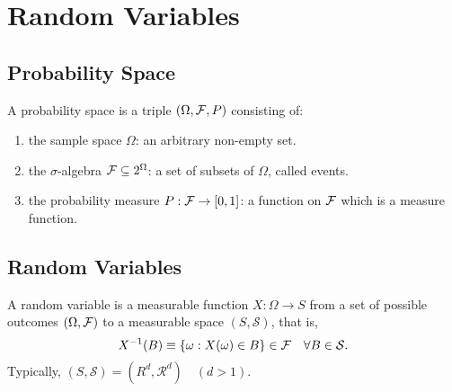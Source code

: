 \chapter{Random Variables}


\section{Probability Space}

\begin{definition}
	A probability space is a triple \((\Omega,\mathcal{F},P)\) consisting of:
	\begin{enumerate}
		\item the sample space \(\Omega\): an arbitrary non-empty set.
		\item the \(\sigma\)-algebra \(\mathcal{F}\subseteq 2^{\Omega}\): a set of subsets of \(\Omega\), called events.
		\item the probability measure \(P:\mathcal{F} \rightarrow[0,1]\): a function on \(\mathcal{F}\) which is a measure function.
	\end{enumerate}
\end{definition}

\section{Random Variables}

\begin{definition}
	A random variable is a measurable function \(X:\Omega\rightarrow S\) from a set of possible outcomes \((\Omega,\mathcal{F})\) to a measurable space \((S,\mathcal{S})\), that is,
	\begin{equation}
		X^{-1}(B)\equiv\{\omega:X(\omega)\in B\}\in\mathcal{F}\quad \forall B\in\mathcal{S}.
	\end{equation}
	Typically, \((S,\mathcal{S})=(R^d,\mathcal{R}^d)\quad(d>1)\).
\end{definition}

